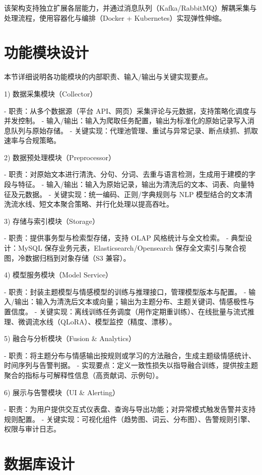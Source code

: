 该架构支持独立扩展各层能力，并通过消息队列（Kafka/RabbitMQ）解耦采集与处理流程，使用容器化与编排（Docker + Kubernetes）实现弹性伸缩。

\section{功能模块设计}
\label{sec:modules}

本节详细说明各功能模块的内部职责、输入/输出与关键实现要点。

1) 数据采集模块（Collector）

- 职责：从多个数据源（平台 API、网页）采集评论与元数据，支持策略化调度与并发控制。
- 输入/输出：输入为爬取任务配置，输出为标准化的原始记录写入消息队列与原始存储。 
- 关键实现：代理池管理、重试与异常记录、断点续抓、抓取速率与合规策略。 

2) 数据预处理模块（Preprocessor）

- 职责：对原始文本进行清洗、分句、分词、去重与语言检测，生成用于建模的字段与特征。 
- 输入/输出：输入为原始记录，输出为清洗后的文本、词表、向量特征及元数据。 
- 关键实现：统一编码、正则/字典规则与 NLP 模型结合的文本清洗流水线、短文本聚合策略、并行化处理以提高吞吐。 

3) 存储与索引模块（Storage）

- 职责：提供事务型与检索型存储，支持 OLAP 风格统计与全文检索。 
- 典型设计：MySQL 保存业务元表，Elasticsearch/Opensearch 保存全文索引与聚合视图，冷数据归档到对象存储（S3 兼容）。 

4) 模型服务模块（Model Service）

- 职责：封装主题模型与情感模型的训练与推理接口，管理模型版本与配置。 
- 输入/输出：输入为清洗后文本或向量；输出为主题分布、主题关键词、情感极性与置信度。 
- 关键实现：离线训练任务调度（用作定期重训练）、在线批量与流式推理、微调流水线（QLoRA）、模型监控（精度、漂移）。

5) 融合与分析模块（Fusion \& Analytics）

- 职责：将主题分布与情感输出按规则或学习的方法融合，生成主题级情感统计、时间序列与告警判据。 
- 实现要点：定义一致性损失以指导融合训练，提供按主题聚合的指标与可解释性信息（高贡献词、示例句）。

6) 展示与告警模块（UI \& Alerting）

- 职责：为用户提供交互式仪表盘、查询与导出功能；对异常模式触发告警并支持规则配置。 
- 关键实现：可视化组件（趋势图、词云、分布图）、告警规则引擎、权限与审计日志。 

\section{数据库设计}
\label{sec:database}

